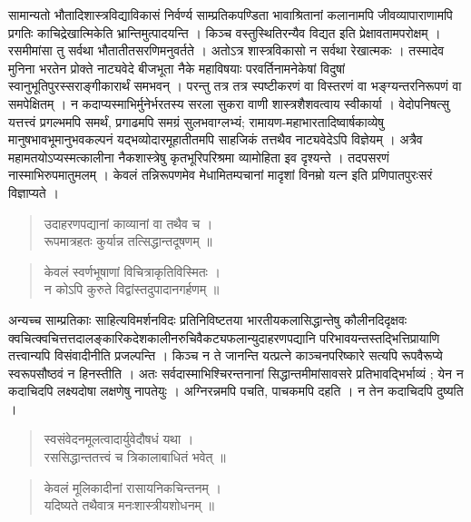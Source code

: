 {\dev सामान्यतो भौतादिशास्त्रविद्याविकासं निर्वर्ण्य साम्प्रतिकपण्डिता भावाश्रितानां कलानामपि जीवव्यापाराणामपि प्रगतिः काचिद्रेखात्मिकेति भ्रान्तिमुत्पादयन्ति । किञ्च वस्तुस्थितिरन्यैव विद्यत इति प्रेक्षावतामपरोक्षम् । रसमीमांसा तु सर्वथा भौतातीतसरणिमनुवर्तते । अतोऽत्र शास्त्रविकासो न सर्वथा रेखात्मकः । तस्मादेव मुनिना भरतेन प्रोक्ते नाट्यवेदे बीजभूता नैके महाविषयाः परवर्तिनामनेकेषां विदुषां स्वानुभूतिपुरस्सराङ्गीकारार्थं समभवन् । परन्तु तत्र तत्र स्पष्टीकरणं वा विस्तरणं वा भङ्ग्यन्तरनिरूपणं वा समपेक्षितम् । न कदाप्यस्माभिर्मुनेर्भरतस्य सरला सुकरा वाणी शास्त्रशैशवत्वाय स्वीकार्या । वेदोपनिषत्सु यत्तत्त्वं प्रगल्भमपि समर्थं, प्रगाढमपि समग्रं सुलभवाग्लभ्यं; रामायण-महाभारतादिष्वार्षकाव्येषु मानुषभावभूमानुभव\-कल्पनं यद्भव्योदारमूहातीतमपि साहजिकं तत्तथैव नाट्यवेदेऽपि विज्ञेयम् । अत्रैव महामतयोऽप्यस्मत्कालीना नैकशास्त्रेषु कृतभूरिपरिश्रमा व्यामोहिता इव दृश्यन्ते । तदपसरणं नास्माभिरुपमातुमलम् । केवलं तन्निरूपणमेव मेधामितम्पचानां मादृशां विनम्रो यत्न इति प्रणिपातपुरःसरं विज्ञाप्यते ।}
\begin{quote}
{\dev उदाहरणपद्यानां काव्यानां वा तथैव च ।}\\
{\dev रूपमात्रहतः कुर्यान्न तत्सिद्धान्तदूषणम् ॥}
\end{quote}
\begin{quote}
{\dev केवलं स्वर्णभूषाणां विचित्राकृतिविस्मितः ।}\\
{\dev न कोऽपि कुरुते विद्वांस्तदुपादानगर्हणम् ॥}
\end{quote}

{\dev अन्यच्च साम्प्रतिकाः साहित्यविमर्शनविदः प्रतिनिविष्टतया भारतीयकलासिद्धान्तेषु कौलीनदि\-दृक्षवः क्वचित्क्वचित्तत्तदालङ्कारिकदेशकालीनरुचिवैकट्यफलान्युदाहरणपद्यानि परिभावयन्त\-स्तद्भित्तिप्रायाणि तत्त्वान्यपि विसंवादीनीति प्रजल्पन्ति । किञ्च न ते जानन्ति यत्प्रत्ने काञ्चन\-परिष्कारे सत्यपि रूपवैरूप्ये स्वरूपसौष्ठवं न हिनस्तीति । अतः सर्वदास्माभिश्चिरन्तनानां सिद्धान्तमीमांसावसरे प्रतिभावद्भिर्भाव्यं ; येन न कदाचिदपि लक्ष्यदोषा लक्षणेषु नापतेयुः । अग्निरन्नमपि पचति, पाचकमपि दहति । न तेन कदाचिदपि दुष्यति ।}  
\begin{quote}
{\dev स्वसंवेदनमूलत्वादार्युवेदौषधं यथा ।}\\
{\dev रससिद्धान्ततत्त्वं च त्रिकालाबाधितं भवेत् ॥}
\end{quote}
\begin{quote}
{\dev केवलं मूलिकादीनां रासायनिकचिन्तनम् ।}\\
{\dev यदिष्यते तथैवात्र मनःशास्त्रीयशोधनम् ॥}
\end{quote}

